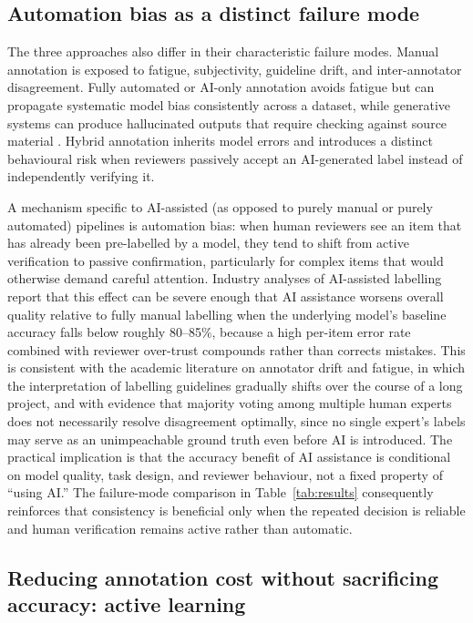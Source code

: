 \documentclass[acmsmall,nonacm]{acmart}
\begin{document}
\subsection{Automation bias as a distinct failure mode}
\label{subsec:automation-bias}

The three approaches also differ in their characteristic failure modes. Manual annotation is exposed to fatigue, subjectivity, guideline drift, and inter-annotator disagreement. Fully automated or AI-only annotation avoids fatigue but can propagate systematic model bias consistently across a dataset, while generative systems can produce hallucinated outputs that require checking against source material \citep{chelli2024hallucination}. Hybrid annotation inherits model errors and introduces a distinct behavioural risk when reviewers passively accept an AI-generated label instead of independently verifying it.

A mechanism specific to AI-assisted (as opposed to purely manual or purely automated) pipelines is automation bias: when human reviewers see an item that has already been pre-labelled by a model, they tend to shift from active verification to passive confirmation, particularly for complex items that would otherwise demand careful attention. Industry analyses of AI-assisted labelling report that this effect can be severe enough that AI assistance worsens overall quality relative to fully manual labelling when the underlying model's baseline accuracy falls below roughly 80--85\%, because a high per-item error rate combined with reviewer over-trust compounds rather than corrects mistakes. This is consistent with the academic literature on annotator drift and fatigue, in which the interpretation of labelling guidelines gradually shifts over the course of a long project, and with evidence that majority voting among multiple human experts does not necessarily resolve disagreement optimally, since no single expert's labels may serve as an unimpeachable ground truth even before AI is introduced. The practical implication is that the accuracy benefit of AI assistance is conditional on model quality, task design, and reviewer behaviour, not a fixed property of ``using AI.'' The failure-mode comparison in Table~\ref{tab:results} consequently reinforces that consistency is beneficial only when the repeated decision is reliable and human verification remains active rather than automatic.

\subsection{Reducing annotation cost without sacrificing accuracy: active learning}
\label{subsec:active-learning}
\end{document}
